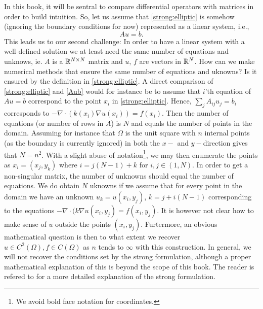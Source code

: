 In this book, it will be sentral to compare differential operators with matrices in order to build
intuition. So, let us assume that  
\eqref{strong:elliptic} is somehow (ignoring the boundary conditions for now)  represented as a linear system, i.e.,  
\begin{equation}
\label{Aub}
A u = b .  
\end{equation}
This leads us to our second challenge: In order to have a linear system with a well-defined solution we at least need the same number 
of equations and unknows, ie.  
$A$ is a $\mathbb{R}^{N\times N}$ matrix and $u$, $f$ are vectors in $\mathbb{R}^N$. How can we make numerical methods that ensure
the same number of equations and uknowns? Is it ensured by the definition in \eqref{strong:elliptic}.  
A direct comparison of \eqref{strong:elliptic} and \eqref{Aub} would for instance be to assume that $i$'th equation of $A u = b$ correspond to the point $x_i$ in
\eqref{strong:elliptic}. Hence, $\sum_j A_{ij} u_j = b_i$ corresponds
to $-\nabla\cdot(k(x_i) \nabla u(x_i))  = f(x_i)$.   
Then the number of equations (or number of rows in $A$) is $N$ and equals the number
of points in the domain.  Assuming for instance
that $\Omega$ is the unit square with $n$ internal points (as the boundary is currently ignored) in both the $x-$ and $y-$direction 
gives that $N=n^2$. With a slight abuse of notation\footnote{We avoid bold face notation for coordinates. }, we may then enumerate the points as
$x_i = (x_j, y_k)$ where $i = j(N-1) + k$ for $i,j \in (1, N)$.  
In order to get a non-singular matrix, the number of unknowns should
equal the number of equations. We do obtain $N$ uknowns if we assume that for every
point in the domain we have an unknown $u_k = u(x_i, y_j)$, $k=j+i(N-1)$ corresponding to  
the equations 
$-\nabla\cdot (k \nabla  u(x_i, y_j) = f(x_i, y_j)$. It is however not clear how to make sense of $u$ outside the points $(x_i, y_j)$.      
Furtermore, an obvious mathematical question is then to what extent we recover $ u \in C^2(\Omega), f \in C(\Omega)$ as $n$ tends to $\infty$
with this construction. In general, we will not recover the conditions set by the strong formulation, although a proper mathematical 
explanation of this is beyond the scope of this book. The reader is refered to \cite{evans2022partial} for a more detailed
explanation of the strong formulation. 



